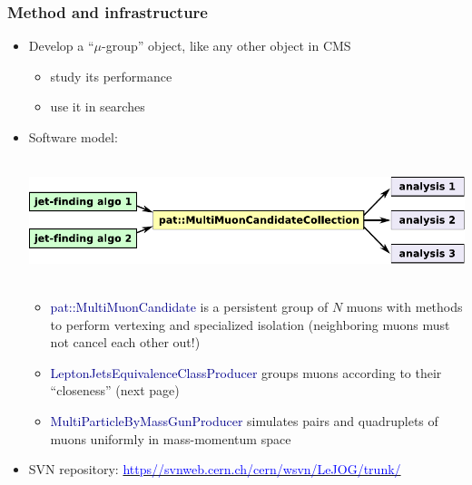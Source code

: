 \documentclass[compress]{beamer}
\begin{document}
\begin{frame}
\frametitle{Method and infrastructure}
\begin{itemize}
\item Develop a ``$\mu$-group'' object, like any other object in CMS
\begin{itemize}
\item study its performance
\item use it in searches
\end{itemize}

\item Software model:

\mbox{ } \hfill \includegraphics[width=0.8\linewidth]{jets_to_analyses.pdf} \hfill \mbox{ }

\begin{itemize}
\item \textcolor{darkblue}{pat::MultiMuonCandidate} is a persistent group of $N$ muons with methods to perform vertexing and specialized isolation (neighboring muons must not cancel each other out!)
\item \textcolor{darkblue}{LeptonJetsEquivalenceClassProducer} groups muons according to their ``closeness'' (next page)
\item \textcolor{darkblue}{MultiParticleByMassGunProducer} simulates pairs and quadruplets of muons uniformly in mass-momentum space
\end{itemize}

\item SVN repository: \href{https//svnweb.cern.ch/cern/wsvn/LeJOG/trunk/}{\textcolor{blue}{https//svnweb.cern.ch/cern/wsvn/LeJOG/trunk/}}
\end{itemize}
\end{frame}
\end{document}
